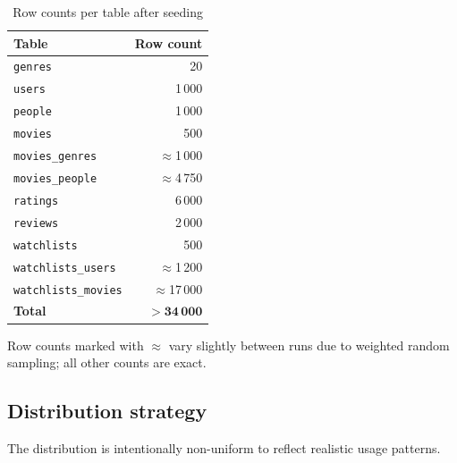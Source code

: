 \documentclass[11pt, a4paper]{article}
\begin{document}
\begin{table}[H]
    \centering
    \caption{Row counts per table after seeding}
    \label{tab:seed-counts}
    \begin{tabular}{l r}
        \toprule
        \textbf{Table} & \textbf{Row count} \\
        \midrule
        \texttt{genres}              & 20     \\
        \texttt{users}               & 1\,000 \\
        \texttt{people}              & 1\,000 \\
        \texttt{movies}              & 500    \\
        \texttt{movies\_genres}      & $\approx$1\,000 \\
        \texttt{movies\_people}      & $\approx$4\,750 \\
        \texttt{ratings}             & 6\,000 \\
        \texttt{reviews}             & 2\,000 \\
        \texttt{watchlists}          & 500    \\
        \texttt{watchlists\_users}   & $\approx$1\,200 \\
        \texttt{watchlists\_movies}  & $\approx$17\,000 \\
        \midrule
        \textbf{Total}               & $\mathbf{>34\,000}$ \\
        \bottomrule
    \end{tabular}
\end{table}

\noindent Row counts marked with $\approx$ vary slightly between runs due to
weighted random sampling; all other counts are exact.

\subsection{Distribution strategy}

The distribution is intentionally non-uniform to reflect realistic usage
patterns.
\end{document}
